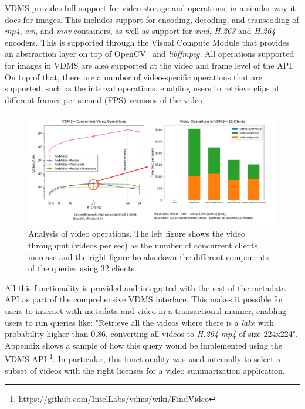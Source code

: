 VDMS provides full support for video storage and operations,
in a similar way it does for images.
This includes support for encoding, decoding, and transcoding of
\textit{mp4}, \textit{avi}, and \textit{mov} containers,
as well as support for \textit{xvid}, \textit{H.263} and \textit{H.264} encoders.
This is supported through the Visual Compute Module that provides an abstraction
layer on top of OpenCV~\cite{opencv} and \textit{libffmpeg}\cite{ffmpeg}.
All operations supported for images in VDMS are also supported at the
video and frame level of the API.
On top of that, there are a number of video-specific operations that
are supported, such as the interval operations,
enabling users to retrieve clips at different
frames-per-second (FPS) versions of the video.

\begin{figure}[ht!]
\centering
\includegraphics[width=\textwidth]{figures/video_overhead}
\caption{Analysis of video operations. The left figure shows the video throughput (videos per sec) as the number of concurrent clients increase and the right figure breaks down the different components of the
queries using 32 clients.}
\label{fig:video}
\end{figure}

All this functionality is provided and integrated with the rest of the
metadata API as part of the comprehensive VDMS interface.
This makes it possible for users to interact with metadata and video in 
a transactional manner, enabling users to run queries like: 
"Retrieve all the videos where there is a \textit{lake} with 
probability higher than 0.86, converting all videos to \textit{H.264} 
\textit{mp4} of size 224x224".
Appendix shows a sample of how this query would be implemented using the VDMS API
\footnote{https://github.com/IntelLabs/vdms/wiki/FindVideo}.
In particular, this functionality was used internally to select a subset
of videos with the right licenses for a video summarization application.

